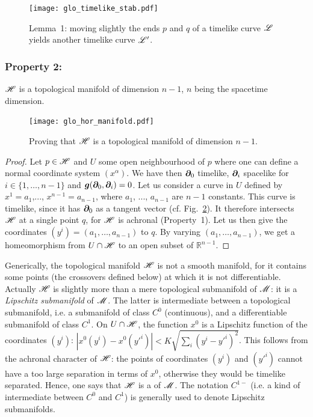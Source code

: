 \begin{figure}
\centerline{\texttt{[image: glo\_timelike\_stab.pdf]}}
\caption[]{\label{f:glo:timelike_stab} \footnotesize
Lemma~1: moving slightly the ends $p$ and $q$ of a timelike curve $\mathscr{L}$
yields another timelike curve $\mathscr{L}'$.}
\end{figure}


\subsubsection{Property 2:}
\begin{greybox}
$\mathscr{H}$ is a topological manifold of dimension $n-1$, $n$ being the spacetime
dimension.
\end{greybox}

\begin{figure}
\centerline{\texttt{[image: glo\_hor\_manifold.pdf]}}
\caption[]{\label{f:glo:hor_manifold} \footnotesize
Proving that $\mathscr{H}$ is a topological manifold of dimension $n-1$.}
\end{figure}

\begin{proof}
Let $p\in\mathscr{H}$ and $U$ some open neighbourhood of $p$ where one can define
a normal coordinate system $(x^\alpha)$. We have then $\bm{\partial}_0$ timelike,
$\bm{\partial}_i$ spacelike for $i\in\{1,\ldots,n-1\}$ and $\bm{g}(\bm{\partial}_0, \bm{\partial}_i) = 0$.
Let us consider a curve in $U$ defined by $x^1 = a_1$,..., $x^{n-1} = a_{n-1}$,
where $a_1$, ..., $a_{n-1}$ are $n-1$ constants.
This curve is timelike, since it has $\bm{\partial}_0$ as a tangent vector
(cf. Fig.~\ref{f:glo:hor_manifold}).
It therefore intersects $\mathscr{H}$ at a single point $q$, for $\mathscr{H}$ is achronal (Property~1).
Let us then give the coordinates $(y^i) = (a_1,\ldots,a_{n-1})$ to $q$.
By varying $(a_1,\ldots,a_{n-1})$, we get a homeomorphism from $U\cap\mathscr{H}$
to an open subset of $\mathbb{R}^{n-1}$.
\end{proof}

\begin{remark}
Generically, the topological manifold $\mathscr{H}$ is not a smooth manifold, for it
contains some points (the crossovers defined below) at which it is not differentiable.
Actually $\mathscr{H}$ is slightly more than a mere topological submanifold of $\mathscr{M}$: it is a
\emph{Lipschitz submanifold} of $\mathscr{M}$. The latter is
intermediate between a topological submanifold, i.e.
a submanifold of class $C^0$ (continuous), and a differentiable submanifold of
class $C^1$. On $U\cap\mathscr{H}$, the function $x^0$ is a Lipschitz function
of the coordinates $(y^i)$: $\left|x^0(y^i) - x^0({y'}^i)\right| < K \sqrt{\sum_i (y^i - {y'}^i)^2}$.
This follows from the achronal character of $\mathscr{H}$: the points of coordinates
$(y^i)$ and $({y'}^i)$ cannot have a too large separation in terms of $x^0$,
otherwise they would be timelike separated.
Hence, one says that $\mathscr{H}$ is a  of $\mathscr{M}$. The notation $C^{1-}$ (i.e. a kind of intermediate between
$C^0$ and $C^1$) is generally used to denote Lipschitz submanifolds.
\end{remark}

